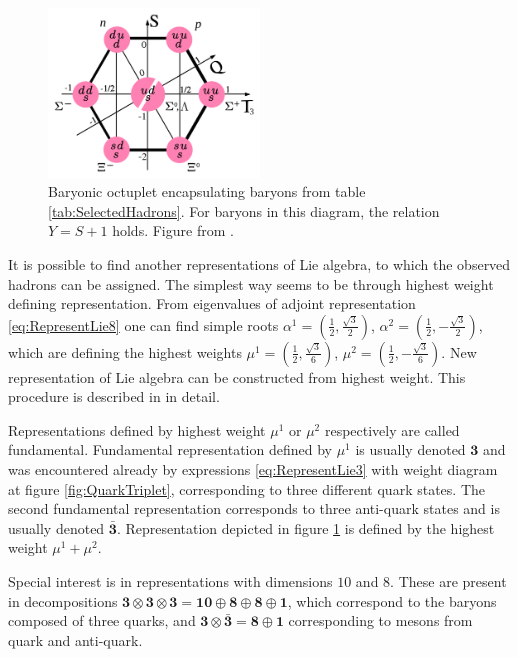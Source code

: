 \documentclass[a4paper,11pt]{report}
\begin{document}
\begin{figure}[t]
  \centering
  \includegraphics[width=0.5\textwidth]{Chapter1/Baryon-octet.png} 
  \caption{Baryonic octuplet encapsulating baryons from table
    \ref{tab:SelectedHadrons}. For baryons in this diagram, the relation $Y = S
    + 1$ holds. Figure from \cite{wiki:EightFoldWay}.}
  \label{fig:BaryonicOctet}
\end{figure}

It is possible to find another representations of Lie algebra, to which the
observed hadrons can be assigned. The simplest way seems to be through highest
weight defining representation. From eigenvalues of adjoint representation
\eqref{eq:RepresentLie8} one can find simple roots 
$\alpha^1=\left( \frac{1}{2}, \frac{\sqrt{3}}{2} \right)$, 
$\alpha^2=\left( \frac{1}{2}, - \frac{\sqrt{3}}{2} \right)$, 
which are defining the highest weights 
$\mu^1=\left( \frac{1}{2}, \frac{\sqrt{3}}{6} \right)$, 
$\mu^2=\left( \frac{1}{2}, - \frac{\sqrt{3}}{6} \right)$.
New representation of Lie algebra can be constructed from highest weight. This
procedure is described in \cite{LieAlgebrasForParticlePhysicists} in detail.

Representations defined by highest weight $\mu^1$ or $\mu^2$ respectively are
called fundamental. Fundamental representation defined by $\mu^1$ is usually
denoted $\mathbf{3}$ and was encountered already by expressions
\eqref{eq:RepresentLie3} with weight diagram at figure \ref{fig:QuarkTriplet},
corresponding to three different quark states. The second fundamental
representation corresponds to three anti-quark states and is usually denoted
$\bar{\mathbf{3}}$. Representation depicted in figure \ref{fig:BaryonicOctet} is
defined by the highest weight $\mu^1 + \mu^2$.

Special interest is in representations with dimensions $10$ and $8$. These
are present in decompositions $\mathbf{3} \otimes \mathbf{3} \otimes
\mathbf{3} = \mathbf{10} \oplus \mathbf{8} \oplus \mathbf{8} \oplus \mathbf{1}$,
which correspond to the baryons composed of three quarks, and $\mathbf{3}
\otimes \bar{\mathbf{3}} = \mathbf{8} \oplus \mathbf{1}$ corresponding to
mesons from quark and anti-quark.
\end{document}
